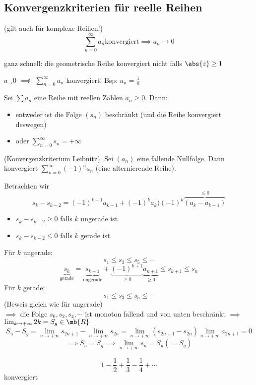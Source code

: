 \subsection{Konvergenzkriterien für reelle Reihen}
\begin{Bem}
  (gilt auch für komplexe Reihen!)
  \[\sum^\infty_{n=0}a_n \text{konvergiert}\implies a_n\to 0\]
\end{Bem}
\begin{Ueb}
  ganz schnell: die geometrische Reihe konvergiert nicht falls $\abs{z}\geq 1$
\end{Ueb}
\begin{Bem}
  $a_\to 0$ $\not\implies$ $\sum^\infty_{n=0}a_n$ konvergiert! Bsp: $a_n=\frac{1}{n}$
\end{Bem}
\begin{Sat}
  Sei $\sum a_n$ eine Reihe mit reellen Zahlen $a_n\geq 0$. Dann:
  \begin{itemize}
    \item entweder ist die Folge $(s_n)$ beschränkt (und die Reihe konvergiert deswegen)
    \item oder $\sum^\infty_{n=0}s_n=+\infty$
  \end{itemize}
\end{Sat}
\begin{Sat}
  (Konvergenzkriterium Leibnitz). Sei $(a_n)$ eine fallende Nullfolge. Dann konvergiert $\sum^\infty_{n=0}(-1)^na_n$ (eine alternierende Reihe).
\end{Sat}
\begin{Bew}
  Betrachten wir 
  \[s_k-s_{k-2}=(-1)^{k-1}a_{k-1}+(-1)^ka_k)(-1)^k\overbrace{(a_k-a_{k-1})}^{\leq 0}\]
  \begin{itemize}
    \item $s_k-s_{k-2}\geq 0$ falls $k$ ungerade ist
    \item $s_k-s_{k-2}\leq 0$ falls $k$ gerade ist
  \end{itemize}
  Für $k$ ungerade:
  \[s_1\leq s_3\leq s_5\leq \cdots\]
  \[\underbrace{s_k}_{\text{gerade}}=\underbrace{s_{k+1}}_{\text{ungerade}}+\underbrace{(-1)^{k+1}}_{\geq 0}\underbrace{a_{n+1}}_{\geq 0}\leq s_{k+1}\leq s_n\]
  Für $k$ gerade:
  \[s_1\leq s_3\leq s_5\leq \cdots\]
  (Beweis gleich wie für ungerade)\\
  $\implies$ die Folge $s_0,s_2,s_4,\cdots$ ist monoton fallend und von unten beschränkt $\implies$ $\lim_{k\to+\infty} 2k=S_g\in\mb{R}$
  \[S_u-S_g=\lim_{n\to+\infty}s_{2n+1}-\lim_{n\to+\infty}s_{2n}=\lim_{n\to+\infty}(s_{2n+1}-s_{2n})\lim_{n\to+\infty}a_{2n+1}=0\]
  \[\implies S_u=S_g\implies \lim_{n\to+\infty}s_n=S_u(=S_g)\]
\end{Bew}
\begin{Kor}
  \[1-\frac{1}{2}+\frac{1}{3}-\frac{1}{4}+\cdots\]
  konvergiert
\end{Kor}
